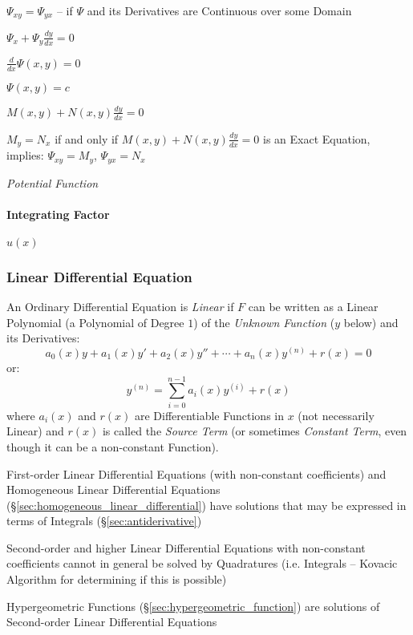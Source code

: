 $\Psi_{xy} = \Psi_{yx}$ -- if $\Psi$ and its Derivatives are Continuous over
some Domain

$\Psi_x + \Psi_y \frac{dy}{dx} = 0$

$\frac{d}{dx}\Psi(x,y) = 0$

$\Psi(x,y) = c$

$M(x,y) + N(x,y)\frac{dy}{dx} = 0$

$M_y = N_x$ if and only if $M(x,y) + N(x,y)\frac{dy}{dx} = 0$ is an Exact
Equation, implies: $\Psi_{xy} = M_y$, $\Psi_{yx} = N_x$

\emph{Potential Function}



\paragraph{Integrating Factor}\label{sec:integrating_factor}\hfill

$u(x)$



\subsubsection{Linear Differential Equation}
\label{sec:linear_differential_equation}

An Ordinary Differential Equation is \emph{Linear} if $F$ can be written as a
Linear Polynomial (a Polynomial of Degree $1$) of the \emph{Unknown Function}
($y$ below) and its Derivatives:
\[
  a_0(x)y + a_1(x)y' + a_2(x)y'' + \cdots + a_n(x)y^{(n)} + r(x) = 0
\]
or:
\[
  y^{(n)} = \sum_{i=0}^{n-1} a_i(x) y^{(i)} + r(x)
\]
where $a_i(x)$ and $r(x)$ are Differentiable Functions in $x$ (not necessarily
Linear) and $r(x)$ is called the \emph{Source Term} (or sometimes
\emph{Constant Term}, even though it can be a non-constant Function).

First-order Linear Differential Equations (with non-constant coefficients) and
Homogeneous Linear Differential Equations
(\S\ref{sec:homogeneous_linear_differential}) have solutions that may
be expressed in terms of Integrals (\S\ref{sec:antiderivative})

Second-order and higher Linear Differential Equations with non-constant
coefficients cannot in general be solved by Quadratures (i.e. Integrals --
Kovacic Algorithm for determining if this is possible)

Hypergeometric Functions (\S\ref{sec:hypergeometric_function}) are solutions of
Second-order Linear Differential Equations

